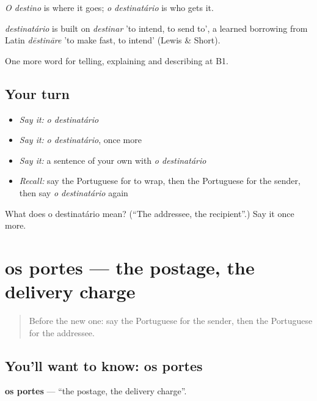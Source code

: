 \emph{O destino} is where it goes; \emph{o destinatário} is who gets it.

\begin{cousinweb}
\emph{destinatário} is built on \emph{destinar} 'to intend, to send to', a learned borrowing from Latin \emph{dēstināre} 'to make fast, to intend' (Lewis \& Short).
\end{cousinweb}

\begin{grammarlens}[title={What you've built}]
One more word for telling, explaining and describing at B1.
\end{grammarlens}

\subsection*{Your turn}
\begin{itemize}
\raggedright
  \item \emph{Say it:} \emph{o destinatário}
  \item \emph{Say it:} \emph{o destinatário}, once more
  \item \emph{Say it:} a sentence of your own with \emph{o destinatário}
  \item \emph{Recall:} say the Portuguese for to wrap, then the Portuguese for the sender, then say \emph{o destinatário} again
\end{itemize}

\begin{tcolorbox}[breakable,colback=teal!4,colframe=teal!35!black,title={Before you move on}]
What does o destinatário mean? (\textquotedblleft{}The addressee, the recipient\textquotedblright{}.) Say it once more.
\end{tcolorbox}
\section[os portes]{os portes — the postage, the delivery charge}

\label{lesson:PT-C454-portes}



\begin{quote}
Before the new one: say the Portuguese for the sender, then the Portuguese for the addressee.
\end{quote}

\subsection*{You'll want to know: os portes}
\textbf{os portes} — \textquotedblleft{}the postage, the delivery charge\textquotedblright{}.

